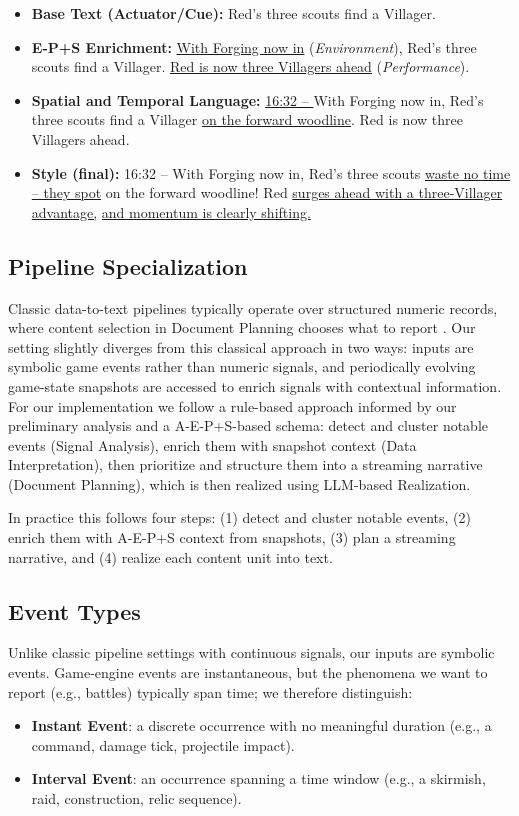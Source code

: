 \begin{itemize}
  \item \textbf{Base Text (Actuator/Cue):} Red's three scouts find a Villager.
  \item \textbf{E-P+S Enrichment:} \underline{With Forging now in} (\textit{Environment}), Red's three scouts find a Villager. \underline{Red is now three Villagers ahead} (\textit{Performance}).
  \item \textbf{Spatial and Temporal Language:} \underline{16:32 -- } With Forging now in, Red's three scouts find a Villager \underline{on the forward woodline}. Red is now three Villagers ahead.
  \item \textbf{Style (final):} 16:32 -- With Forging now in, Red's three scouts \underline{waste no time -- they spot} on the forward woodline! Red \underline{surges ahead with a three-Villager advantage,} \underline{and momentum is clearly shifting.}
\end{itemize}

\subsection{Pipeline Specialization}
Classic data-to-text pipelines typically operate over structured numeric records, where content selection in Document Planning chooses what to report \cite{gkatzia2016}. Our setting slightly diverges from this classical approach in two ways: inputs are symbolic game events rather than numeric signals, and periodically evolving game-state snapshots are accessed to enrich signals with contextual information. For our implementation we follow a rule-based approach informed by our preliminary analysis and a A-E-P+S-based schema: detect and cluster notable events (Signal Analysis), enrich them with snapshot context (Data Interpretation), then prioritize and structure them into a streaming narrative (Document Planning), which is then realized using LLM-based Realization.

In practice this follows four steps: (1) detect and cluster notable events, (2) enrich them with A-E-P+S context from snapshots, (3) plan a streaming narrative, and (4) realize each content unit into text.

\subsection{Event Types}
Unlike classic pipeline settings with continuous signals, our inputs are symbolic events. Game-engine events are instantaneous, but the phenomena we want to report (e.g., battles) typically span time; we therefore distinguish:
\begin{itemize}
  \item \textbf{Instant Event}: a discrete occurrence with no meaningful duration (e.g., a command, damage tick, projectile impact).
  \item \textbf{Interval Event}: an occurrence spanning a time window (e.g., a skirmish, raid, construction, relic sequence).
\end{itemize}

